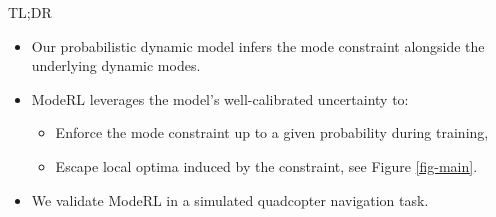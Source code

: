 \documentclass[final,12pt]{beamer}
\newlength{\colwidth}
\begin{document}
\begin{frame}[t]
\begin{columns}[t]
\begin{column}{\colwidth}
\begin{alertblock}{TL;DR}
\begin{itemize}
    \item Our probabilistic dynamic model infers the mode constraint alongside the underlying dynamic modes.
    \item \alert{ModeRL} leverages the model’s well-calibrated uncertainty to:
        \begin{itemize}
            \item Enforce the mode constraint up to a given probability \alert{during training},
            \item Escape local optima induced by the constraint, see Figure \ref{fig-main}.
        \end{itemize}
    \item We validate \alert{ModeRL} in a simulated quadcopter navigation task.
   \end{itemize}


\end{alertblock}
\end{column}
\end{columns}
\end{frame}
\end{document}
